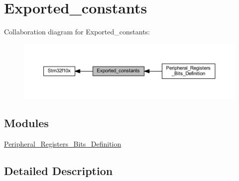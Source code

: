 \hypertarget{group___exported__constants}{}\section{Exported\+\_\+constants}
\label{group___exported__constants}
Collaboration diagram for Exported\+\_\+constants\+:
\nopagebreak
\begin{figure}[H]
\begin{center}
\leavevmode
\includegraphics[width=350pt]{group___exported__constants}
\end{center}
\end{figure}
\subsection*{Modules}
\begin{DoxyCompactItemize}
\item 
\hyperlink{group___peripheral___registers___bits___definition}{Peripheral\+\_\+\+Registers\+\_\+\+Bits\+\_\+\+Definition}
\end{DoxyCompactItemize}


\subsection{Detailed Description}
